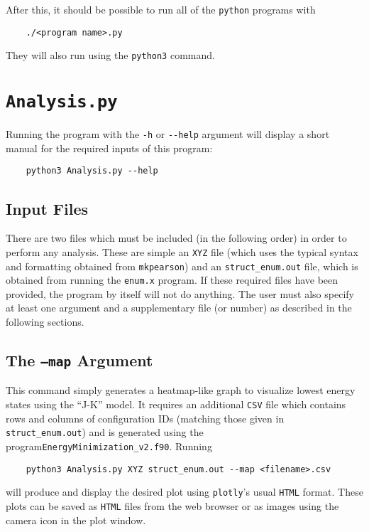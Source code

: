 \documentclass[12pt]{article}
\begin{document}
After this, it should be possible to run all of the \texttt{python} programs with
\begin{verbatim}
    ./<program name>.py
\end{verbatim}

They will also run using the \texttt{python3} command.

\section{\texttt{Analysis.py}}

Running the program with the \verb|-h| or \verb|--help| argument will display a short manual for the required inputs of this program:
\begin{verbatim}
    python3 Analysis.py --help
\end{verbatim}

\subsection{Input Files}
There are two files which must be included (in the following order) in order to perform any analysis. These are simple an \texttt{XYZ} file (which uses the typical syntax and formatting obtained from \texttt{mkpearson}) and an \texttt{struct\_enum.out} file, which is obtained from running the \texttt{enum.x} program. If these required files have been provided, the program by itself will not do anything. The user must also specify at least one argument and a supplementary file (or number) as described in the following sections.

\subsection{The \texttt{--map} Argument}

This command simply generates a heatmap-like graph to visualize lowest energy states using the ``J-K'' model. It requires an additional \texttt{CSV} file which contains rows and columns of configuration IDs (matching those given in \texttt{struct\_enum.out}) and is generated using the program\break \texttt{EnergyMinimization\_v2.f90}. Running
\begin{verbatim}
    python3 Analysis.py XYZ struct_enum.out --map <filename>.csv
\end{verbatim}
will produce and display the desired plot using \texttt{plotly}'s usual \texttt{HTML} format. These plots can be saved as \texttt{HTML} files from the web browser or as images using the camera icon in the plot window.
\end{document}
